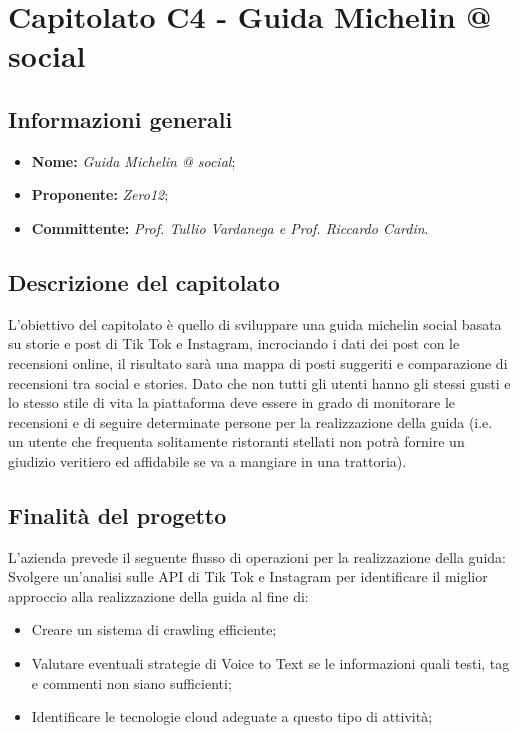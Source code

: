 \section{Capitolato C4 - Guida Michelin @ social}\label{section:c4}

\subsection {Informazioni generali}
\begin{itemize}
    \item \textbf{Nome:} \textit{Guida Michelin @ social};
    \item \textbf{Proponente:} \textit{Zero12};
    \item \textbf{Committente:} \textit{Prof. Tullio Vardanega e Prof. Riccardo Cardin}.
\end{itemize}
\subsection{Descrizione del capitolato}
L'obiettivo del capitolato è quello di sviluppare una guida michelin social basata su storie e post di Tik Tok e Instagram, incrociando i dati dei post con le recensioni online, il risultato sarà una mappa di posti suggeriti e comparazione di recensioni tra social e stories.
Dato che non tutti gli utenti hanno gli stessi gusti e lo stesso stile di vita la piattaforma deve essere in grado di monitorare le recensioni e di seguire determinate persone per la realizzazione della guida (i.e. un utente che frequenta solitamente ristoranti stellati non potrà fornire un giudizio veritiero ed affidabile se va a mangiare in una trattoria).
\subsection {Finalità del progetto}
L'azienda prevede il seguente flusso di operazioni per la realizzazione della guida:
Svolgere un'analisi sulle API di Tik Tok e Instagram per identificare il miglior approccio alla realizzazione della guida al fine di: 
    \begin{itemize}
        \item Creare un sistema di crawling efficiente;
        \item Valutare eventuali strategie di Voice to Text se le informazioni quali testi, tag e commenti non siano sufficienti;
        \item Identificare le tecnologie cloud adeguate a questo tipo di attività;
\end{itemize}
